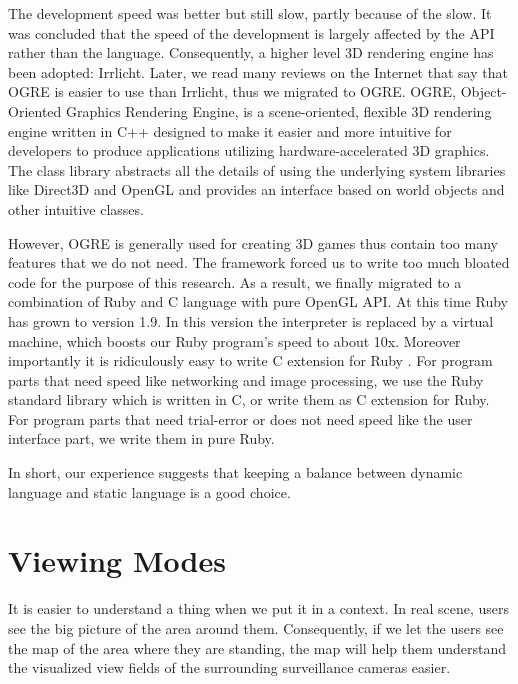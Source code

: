The development speed was better but still slow, partly because of the slow. It was concluded that the speed of the development is largely affected by the API rather than the language. Consequently, a higher level 3D rendering engine has been adopted: Irrlicht. Later, we read many reviews on the Internet that say that OGRE \citep{Reference11} is easier to use than Irrlicht, thus we migrated to OGRE. OGRE, Object-Oriented Graphics Rendering Engine, is a scene-oriented, flexible 3D rendering engine written in C++ designed to make it easier and more intuitive for developers to produce applications utilizing hardware-accelerated 3D graphics. The class library abstracts all the details of using the underlying system libraries like Direct3D and OpenGL and provides an interface based on world objects and other intuitive classes.

However, OGRE is generally used for creating 3D games thus contain too many features that we do not need. The framework forced us to write too much bloated code for the purpose of this research. As a result, we finally migrated to a combination of Ruby and C language with pure OpenGL API. At this time Ruby has grown to version 1.9. In this version the interpreter is replaced by a virtual machine, which boosts our Ruby program's speed to about 10x. Moreover importantly it is ridiculously easy to write C extension for Ruby \citep{Reference15}. For program parts that need speed like networking and image processing, we use the Ruby standard library which is written in C, or write them as C extension for Ruby. For program parts that need trial-error or does not need speed like the user interface part, we write them in pure Ruby.

In short, our experience suggests that keeping a balance between dynamic language and static language is a good choice.


\section{Viewing Modes}

It is easier to understand a thing when we put it in a context. In real scene, users see the big picture of the area around them. Consequently, if we let the users see the map of the area where they are standing, the map will help them understand the visualized view fields of the surrounding surveillance cameras easier.

